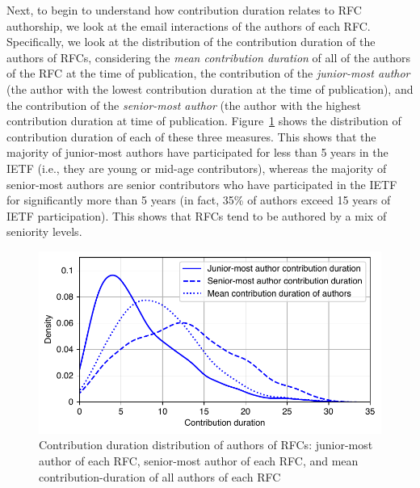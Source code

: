 \documentclass[twocolumn,10pt]{article}
\newlength{\figureWidthOneColumn}
\begin{document}
Next, to begin to understand how contribution duration relates to RFC
authorship, we look at the email interactions of the authors of each RFC.
Specifically, we look at the distribution of the contribution duration of
the authors of RFCs, considering the \emph{mean contribution duration} of
all of the authors of the RFC at the time of publication, the contribution
of the \emph{junior-most author} (the author with the lowest contribution
duration at the time of publication), and the contribution of the
\emph{senior-most author} (the author with the highest contribution
duration at time of publication.  Figure~\ref{fig:age_dist_rfc_authors}
shows the distribution of contribution duration of each of these three
measures. This shows that the majority of junior-most authors have
participated for less than 5 years in the IETF (i.e., they are young or
mid-age contributors), whereas the majority of senior-most authors are
senior contributors who have participated in the IETF for significantly
more than 5 years (in fact, 35\% of authors exceed 15 years of IETF
participation).  This shows that RFCs tend to be authored by a mix of
seniority levels.



\begin{figure}
  \centering
  \includegraphics[width=\figureWidthOneColumn]{figures-prev/imc-2021/emails/age_authors_RFCs.pdf}
  \caption{
    Contribution duration distribution of authors of RFCs:
    junior-most author of each RFC, senior-most author of
    each RFC, and mean contribution-duration of all authors
    of each RFC
  }
\label{fig:age_dist_rfc_authors}
\end{figure}
\end{document}
